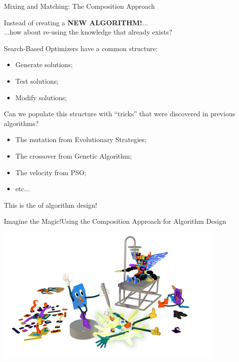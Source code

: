 \documentclass[aspectratio=169]{beamer}
\begin{document}
\begin{frame}{Mixing and Matching: The Composition Approach}

  Instead of creating a \alert{{\bf NEW ALGORITHM!}}...\\
  \hfill ...how about re-using the knowledge that already exists?\bigskip
  
  Search-Based Optimizers have a common structure:
  \begin{itemize}
    \item Generate solutions;
    \item Test solutions;
    \item Modify solutions;
  \end{itemize}\medskip

  Can we populate this structure with ``tricks'' that were
  discovered in previous algorithms?
  \begin{itemize}
    \item The mutation from Evolutionary Strategies;
    \item The crossover from Genetic Algorithm;
    \item The velocity from PSO;
    \item etc...
  \end{itemize}\bigskip

  \begin{block}{}
    This is the  of algorithm design!
  \end{block}
\end{frame}

\begin{frame}{Imagine the Magic!}{Using the Composition Approach for Algorithm Design}
  \begin{center}
    \includegraphics[width=0.85\textwidth]{img/franken_project.png}
  \end{center}
\end{frame}
\end{document}
